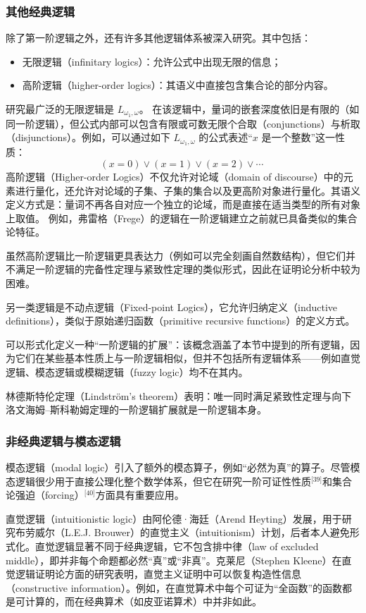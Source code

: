 \subsubsection{其他经典逻辑}
除了第一阶逻辑之外，还有许多其他逻辑体系被深入研究。其中包括：
\begin{itemize}
  \item 无限逻辑（infinitary logics）：允许公式中出现无限的信息；
  \item 高阶逻辑（higher-order logics）：其语义中直接包含集合论的部分内容。
\end{itemize}
研究最广泛的无限逻辑是 \( L_{\omega_{1}, \omega} \)。  在该逻辑中，量词的嵌套深度依旧是有限的（如同一阶逻辑），但公式内部可以包含有限或可数无限个合取（conjunctions）与析取（disjunctions）。例如，可以通过如下 \( L_{\omega_{1}, \omega} \) 的公式表述“\(x\) 是一个整数”这一性质：
\[
(x = 0) \lor (x = 1) \lor (x = 2) \lor \cdots~
\]
高阶逻辑（Higher-order Logics）不仅允许对论域（domain of discourse）中的元素进行量化，还允许对论域的子集、子集的集合以及更高阶对象进行量化。其语义定义方式是：量词不再各自对应一个独立的论域，而是直接在适当类型的所有对象上取值。 例如，弗雷格（Frege）的逻辑在一阶逻辑建立之前就已具备类似的集合论特征。

虽然高阶逻辑比一阶逻辑更具表达力（例如可以完全刻画自然数结构），但它们并不满足一阶逻辑的完备性定理与紧致性定理的类似形式，因此在证明论分析中较为困难。


另一类逻辑是不动点逻辑（Fixed-point Logics），它允许归纳定义（inductive definitions），类似于原始递归函数（primitive recursive functions）的定义方式。

可以形式化定义一种“一阶逻辑的扩展”：该概念涵盖了本节中提到的所有逻辑，因为它们在某些基本性质上与一阶逻辑相似，但并不包括所有逻辑体系——例如直觉逻辑、模态逻辑或模糊逻辑（fuzzy logic）均不在其内。

林德斯特伦定理（Lindström's theorem）表明：唯一同时满足紧致性定理与向下洛文海姆–斯科勒姆定理的一阶逻辑扩展就是一阶逻辑本身。
\subsubsection{非经典逻辑与模态逻辑}
模态逻辑（modal logic）引入了额外的模态算子，例如“必然为真”的算子。尽管模态逻辑很少用于直接公理化整个数学体系，但它在研究一阶可证性性质\(^\text{[39]}\)和集合论强迫（forcing）\(^\text{[40]}\)方面具有重要应用。

直觉逻辑（intuitionistic logic）由阿伦德·海廷（Arend Heyting）发展，用于研究布劳威尔（L.E.J. Brouwer）的直觉主义（intuitionism）计划，后者本人避免形式化。直觉逻辑显著不同于经典逻辑，它不包含排中律（law of excluded middle），即并非每个命题都必然“真”或“非真”。克莱尼（Stephen Kleene）在直觉逻辑证明论方面的研究表明，直觉主义证明中可以恢复构造性信息（constructive information）。例如，在直觉算术中每个可证为“全函数”的函数都是可计算的，而在经典算术（如皮亚诺算术）中并非如此。
